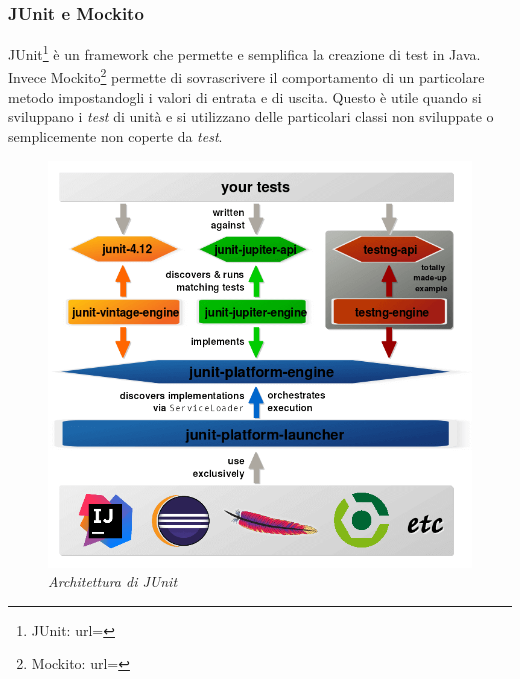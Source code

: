\subsubsection{JUnit e Mockito}
JUnit\footnote{JUnit: url= } è un \gls{framework} che permette e semplifica la creazione di test in Java. Invece Mockito\footnote{Mockito: url= } permette di sovrascrivere il comportamento di un particolare metodo impostandogli i valori di entrata e di uscita. Questo è utile quando si sviluppano i \textit{test} di unità e si utilizzano delle particolari classi non sviluppate o semplicemente non coperte da \textit{test}.
\newpage
\begin{figure}[h!]
	\centering
	\includegraphics[scale=0.27]{immagini/junit.png}
	
	\caption{\textit{Architettura di JUnit }}
\end{figure}




